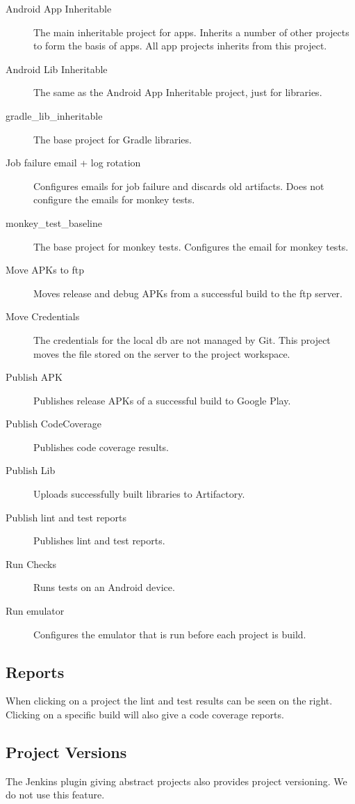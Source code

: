 \begin{description}
  \item[Android App Inheritable] The main inheritable project for apps. Inherits a number of other projects to form the basis of apps. All app projects inherits from this project.
  \item[Android Lib Inheritable] The same as the Android App Inheritable project, just for libraries.
  \item[gradle\_lib\_inheritable] The base project for Gradle libraries.
  \item[Job failure email + log rotation] Configures emails for job failure and discards old artifacts. Does not configure the emails for monkey tests.
  \item[monkey\_test\_baseline] The base project for monkey tests. Configures the email for monkey tests.
  \item[Move APKs to ftp] Moves release and debug APKs from a successful build to the ftp server.
  \item[Move Credentials] The credentials for the local db are not managed by Git. This project moves the file stored on the server to the project workspace.
  \item[Publish APK] Publishes release APKs of a successful build to Google Play.
  \item[Publish CodeCoverage] Publishes code coverage results.
  \item[Publish Lib] Uploads successfully built libraries to Artifactory.
  \item[Publish lint and test reports] Publishes lint and test reports.
  \item[Run Checks] Runs tests on an Android device.
  \item[Run emulator] Configures the emulator that is run before each project is build.
\end{description}

\subsection{Reports}
When clicking on a project the lint and test results can be seen on the right. Clicking on a specific build will also give a code coverage reports.

\subsection{Project Versions}
The Jenkins plugin giving abstract projects also provides project versioning. We do not use this feature.

